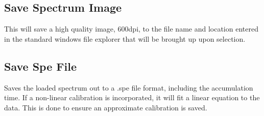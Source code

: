 		\subsection{Save Spectrum Image}
			This will save a high quality image, 600dpi, to the file name and location entered in the standard windows file explorer that will be brought up upon selection.
		\subsection{Save Spe File}
		Saves the loaded spectrum out to a .spe file format, including the accumulation time. If a non-linear calibration is incorporated, it will fit a linear equation to the data. This is done to ensure an approximate calibration is saved.